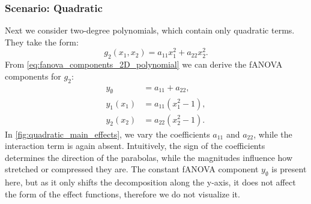 \subsubsection*{Scenario: Quadratic}
Next we consider two-degree polynomials, which contain only quadratic terms. They take the form: $$g_2(x_1, x_2) = a_{11} x_1^2 + a_{22} x_2^2.$$
From \autoref{eq:fanova_components_2D_polynomial} we can derive the fANOVA components for $g_2$:
\begin{align*}
    y_{\emptyset} &= a_{11} + a_{22}, \\
    y_1(x_1) &= a_{11}(x_1^2 - 1), \\
    y_2(x_2) &= a_{22}(x_2^2 - 1).
\end{align*}
In \autoref{fig:quadratic_main_effects}, we vary the coefficients $a_{11}$ and $a_{22}$, while the interaction term is again absent. Intuitively, the sign of the coefficients determines the direction of the parabolas, while the magnitudes influence how stretched or compressed they are. The constant fANOVA component $y_{\emptyset}$ is present here, but as it only shifts the decomposition along the y-axis, it does not affect the form of the effect functions, therefore we do not visualize it.

